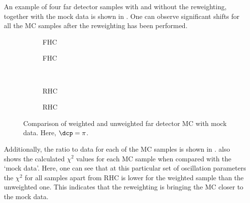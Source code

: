 An example of four far detector samples with and without the reweighting, together with the mock data is shown in .
One can observe significant shifts for all the MC samples after the reweighting has been performed.

\begin{figure}[h]
	\begin{subfigure}[t]{.5\linewidth}
		\begin{adjustbox}{max totalsize=\linewidth, center}
			
		\end{adjustbox}
		\caption{FHC \numu}
	\end{subfigure}
	\hfill
	\begin{subfigure}[t]{.5\linewidth}
		\begin{adjustbox}{max totalsize=\linewidth, center}
			
		\end{adjustbox}
		\caption{FHC \nue}
	\end{subfigure} \\
	\begin{subfigure}[t]{.5\linewidth}
		\begin{adjustbox}{max totalsize=\linewidth, center}
			
		\end{adjustbox}
		\caption{RHC \anumu}
	\end{subfigure}
	\hfill
	\begin{subfigure}[t]{.5\linewidth}
		\begin{adjustbox}{max totalsize=\linewidth, center}
			
		\end{adjustbox}
		\caption{RHC \anue}
	\end{subfigure}
	\caption[Comparison of weighted and unweighted far detector MC with mock data]{Comparison of weighted and unweighted far detector MC with mock data. Here, $\dcp=\pi$.}
	\label{fig:reweightedSamples}
\end{figure}

Additionally, the ratio to data for each of the MC samples is shown in .
 also shows the calculated $\chi^{2}$ values for each MC sample when compared with the `mock data'.
Here, one can see that at this particular set of oscillation parameters the $\chi^{2}$ for all samples apart from \nue RHC is lower for the weighted sample than the unweighted one.
This indicates that the reweighting is bringing the MC closer to the mock data.

